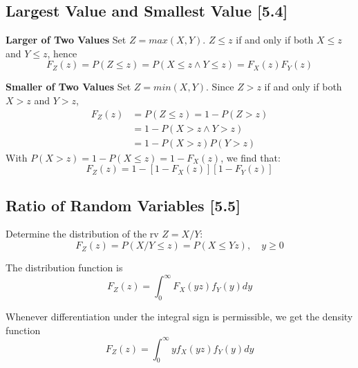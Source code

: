 \documentclass[a4paper,9pt]{extarticle}
\begin{document}
\begin{multicols*}{2}
\subsection{Largest Value and Smallest Value [5.4]}
\textbf{Larger of Two Values}
Set $Z = max(X, Y)$. $Z \leq z$ if and only if both $X \leq z$ and $Y \leq z$, hence
\begin{equation}
    F_Z(z) = P(Z \leq z) = P(X \leq z \wedge Y \leq z) = F_X(z) F_Y(z)
\end{equation}

\textbf{Smaller of Two Values}
Set $Z = min(X, Y)$. Since $Z > z$ if and only if both $X > z$ and $Y > z$,
\begin{equation}
    \begin{split}
        F_Z(z) & = P(Z \leq z) = 1 - P(Z > z) \\
        & = 1 - P(X > z \wedge Y > z) \\
        & = 1 - P(X > z) P(Y > z)
    \end{split}
\end{equation}
With $P(X > z) = 1 - P(X \leq z) = 1 - F_X(z)$, we find that:
\begin{equation}
    F_Z(z) = 1 - [1 - F_X(z)][1 - F_Y(z)]
\end{equation}

\subsection{Ratio of Random Variables [5.5]}
Determine the distribution of the rv $Z = X/Y$:
\begin{equation}
    F_Z(z) = P(X/Y \leq z) = P(X \leq Yz), \quad y \geq 0
\end{equation}

The distribution function is
\begin{equation}
    F_Z(z) = \int_0^{\infty} F_X(yz) f_Y(y) dy
\end{equation}

Whenever differentiation under the integral sign is permissible, we get the density function
\begin{equation}
    F_Z(z) = \int_0^{\infty} y f_X(yz) f_Y(y) dy
\end{equation}

\end{multicols*}
\end{document}
